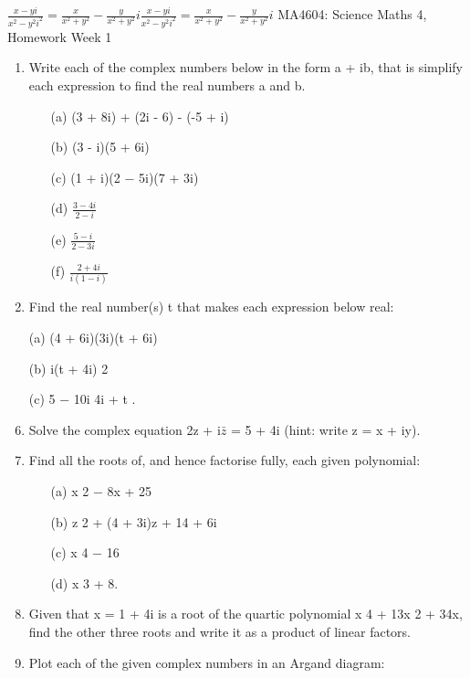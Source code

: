 \documentclass[12pt, a4paper]{report}
\theoremstyle{plain}
\theoremstyle{definition}
\theoremstyle{remark}
\begin{document}
${\displaystyle {\frac {x-yi}{x^{2}-y^{2}i^{2}}}={\frac {x}{x^{2}+y^{2}}}-{\frac {y}{x^{2}+y^{2}}}i} {\displaystyle {\frac {x-yi}{x^{2}-y^{2}i^{2}}}={\frac {x}{x^{2}+y^{2}}}-{\frac {y}{x^{2}+y^{2}}}i}$
\newpage
MA4604: Science Maths 4, Homework Week 1
\begin{enumerate}
\item Write each of the complex numbers below in the form a + ib, that is simplify each
expression to find the real numbers a and b.
\begin{multicols}{2}
\begin{itemize}
\item[(a)] (3 + 8i) + (2i - 6) - (-5 + i) \item[(b)] (3 - i)(5 + 6i) \item[(c)] (1 + i)(2 − 5i)(7 + 3i)
\item[(d)] $ {\displaystyle \frac{3 − 4i}{2 − i} } $

\item[(e)] $ {\displaystyle \frac{5 − i}{2 − 3i} } $ 

\item[(f)] $ {\displaystyle \frac{2 + 4i}{i(1 − i)} } $ 

\end{itemize}
\end{multicols}
\item Find the real number(s) t that makes each expression below real:
\item[(a)] (4 + 6i)(3i)(t + 6i) \item[(b)] i(t + 4i)
2
\item[(c)] 5 − 10i
4i + t
.
\item Solve the complex equation 2z + i$\bar{z}$ = 5 + 4i (hint: write z = x + iy).
\item Find all the roots of, and hence factorise fully, each given polynomial:

\begin{multicols}{2}
\begin{itemize}
\item[(a)] x
2 − 8x + 25 \item[(b)] z
2 + (4 + 3i)z + 14 + 6i \item[(c)] x
4 − 16 \item[(d)] x
3 + 8.
\end{itemize}
\end{multicols}
\item Given that x = 1 + 4i is a root of the quartic polynomial x
4 + 13x
2 + 34x, find the other
three roots and write it as a product of linear factors.
\item Plot each of the given complex numbers in an Argand diagram:


\end{enumerate}
\end{document}
